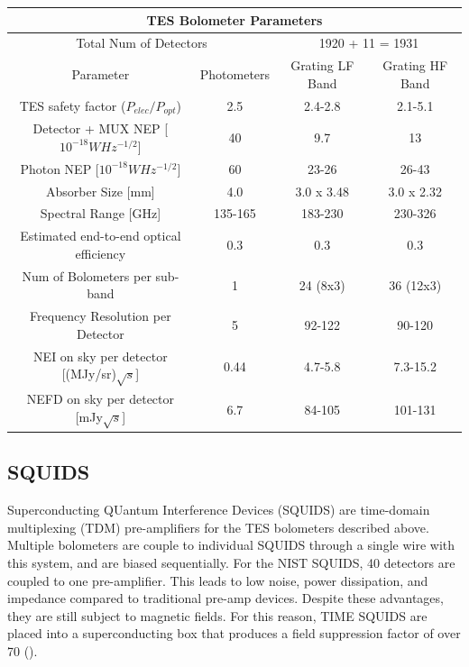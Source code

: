 \documentclass[manuscript]{aastex}
\begin{document}
\begin{center}
    \begin{tabular}{|c|c|c|c|}
    \hline
    \multicolumn{4}{|c|}{TES Bolometer Parameters} \\
    \hline
    \hline
    \multicolumn{2}{|c|}{Total Num of Detectors} & \multicolumn{2}{|c|}{1920 + 11 = 1931} \\
    \hline
    Parameter & Photometers & Grating LF Band & Grating HF Band \\
    \hline
    TES safety factor ($P_{elec}/P_{opt}$) & 2.5 & 2.4-2.8 & 2.1-5.1 \\
    Detector + MUX NEP [$10^{-18} W Hz^{-1/2}$] & 40 & 9.7 & 13 \\
    Photon NEP [$10^{-18} W Hz^{-1/2}$] & 60 & 23-26 & 26-43 \\
    Absorber Size [mm] & 4.0 & 3.0 x 3.48 & 3.0 x 2.32 \\
    Spectral Range [GHz] & 135-165 & 183-230 & 230-326 \\
    Estimated end-to-end optical efficiency & 0.3 & 0.3 & 0.3 \\
    Num of Bolometers per sub-band & 1 & 24 (8x3) & 36 (12x3) \\
    Frequency Resolution per Detector & 5 & 92-122 & 90-120 \\
    NEI on sky per detector [(MJy/sr)$\sqrt{s}$] & 0.44 & 4.7-5.8 & 7.3-15.2 \\
    NEFD on sky per detector [mJy$\sqrt{s}$] & 6.7 & 84-105 & 101-131 \\
    \hline
    \end{tabular}
\end{center}
\subsection{SQUIDS}
Superconducting QUantum Interference Devices (SQUIDS) are time-domain multiplexing (TDM) pre-amplifiers for the TES bolometers described above. Multiple bolometers are couple to individual SQUIDS through a single wire with this system, and are biased sequentially. For the NIST SQUIDS, 40 detectors are coupled to one pre-amplifier. This leads to low noise, power dissipation, and impedance compared to traditional pre-amp devices. Despite these advantages, they are still subject to magnetic fields. For this reason, TIME SQUIDS are placed into a superconducting box that produces a field suppression factor of over 70 (\cite{Hunacek2016b}).
\end{document}
